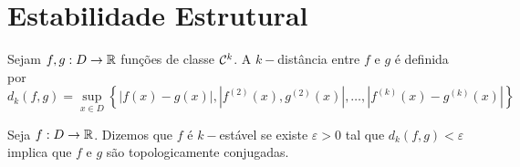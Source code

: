 \section{Estabilidade Estrutural}

\begin{definition}
Sejam $f, g: D \to \mathbb{R}$ funções de classe $\mathcal{C}^k$. A $k-$distância entre $f$ e $g$ é definida por
$$d_k(f, g) = \sup_{x \in D} \left \{ |f(x) - g(x)|, |f^{(2)}(x), g^{(2)}(x)|, \dots, |f^{(k)}(x) - g^{(k)}(x)| \right \}$$
\end{definition}

\begin{definition}
Seja $f: D \to \mathbb{R}$. Dizemos que $f$ é $k-$estável se existe $\varepsilon > 0$ tal que $d_k(f, g) < \varepsilon$ implica que $f$ e $g$ são topologicamente conjugadas.
\end{definition}


